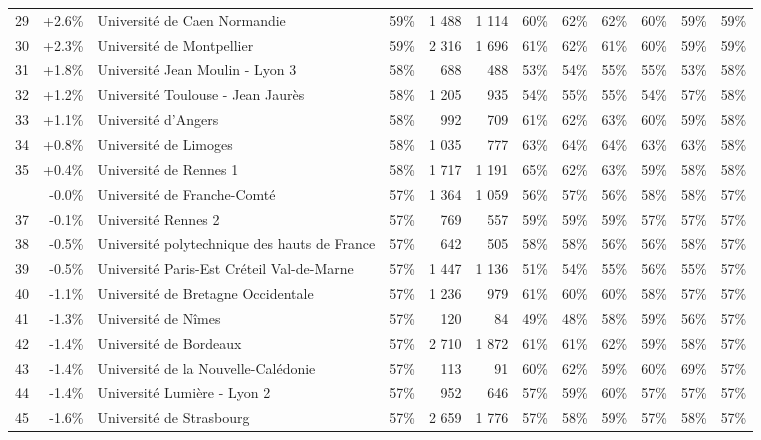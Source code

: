 \documentclass[12pt,french,landscape]{article}
\begin{document}
\begin{longtable}{rrlrrrrrrlrr}
\rowcolor{gray!6}  29 & +2.6\% & Université de Caen Normandie & 59\% & 1 488 & 1 114 & 60\% & 62\% & 62\% & 60\% & 59\% & 59\%\\
30 & +2.3\% & Université de Montpellier & 59\% & 2 316 & 1 696 & 61\% & 62\% & 61\% & 60\% & 59\% & 59\%\\
\addlinespace
\rowcolor{gray!6}  31 & +1.8\% & Université Jean Moulin - Lyon 3 & 58\% & 688 & 488 & 53\% & 54\% & 55\% & 55\% & 53\% & 58\%\\
32 & +1.2\% & Université Toulouse - Jean Jaurès & 58\% & 1 205 & 935 & 54\% & 55\% & 55\% & 54\% & 57\% & 58\%\\
\rowcolor{gray!6}  33 & +1.1\% & Université d'Angers & 58\% & 992 & 709 & 61\% & 62\% & 63\% & 60\% & 59\% & 58\%\\
34 & +0.8\% & Université de Limoges & 58\% & 1 035 & 777 & 63\% & 64\% & 64\% & 63\% & 63\% & 58\%\\
\rowcolor{gray!6}  35 & +0.4\% & Université de Rennes 1 & 58\% & 1 717 & 1 191 & 65\% & 62\% & 63\% & 59\% & 58\% & 58\%\\
\addlinespace
36 & -0.0\% & Université de Franche-Comté & 57\% & 1 364 & 1 059 & 56\% & 57\% & 56\% & 58\% & 58\% & 57\%\\
\rowcolor{gray!6}  37 & -0.1\% & Université Rennes 2 & 57\% & 769 & 557 & 59\% & 59\% & 59\% & 57\% & 57\% & 57\%\\
38 & -0.5\% & Université polytechnique des hauts de France & 57\% & 642 & 505 & 58\% & 58\% & 56\% & 56\% & 58\% & 57\%\\
\rowcolor{gray!6}  39 & -0.5\% & Université Paris-Est Créteil Val-de-Marne & 57\% & 1 447 & 1 136 & 51\% & 54\% & 55\% & 56\% & 55\% & 57\%\\
40 & -1.1\% & Université de Bretagne Occidentale & 57\% & 1 236 & 979 & 61\% & 60\% & 60\% & 58\% & 57\% & 57\%\\
\addlinespace
\rowcolor{gray!6}  41 & -1.3\% & Université de Nîmes & 57\% & 120 & 84 & 49\% & 48\% & 58\% & 59\% & 56\% & 57\%\\
42 & -1.4\% & Université de Bordeaux & 57\% & 2 710 & 1 872 & 61\% & 61\% & 62\% & 59\% & 58\% & 57\%\\
\rowcolor{gray!6}  43 & -1.4\% & Université de la Nouvelle-Calédonie & 57\% & 113 & 91 & 60\% & 62\% & 59\% & 60\% & 69\% & 57\%\\
44 & -1.4\% & Université Lumière - Lyon 2 & 57\% & 952 & 646 & 57\% & 59\% & 60\% & 57\% & 57\% & 57\%\\
\rowcolor{gray!6}  45 & -1.6\% & Université de Strasbourg & 57\% & 2 659 & 1 776 & 57\% & 58\% & 59\% & 57\% & 58\% & 57\%\\

\end{longtable}
\end{document}
